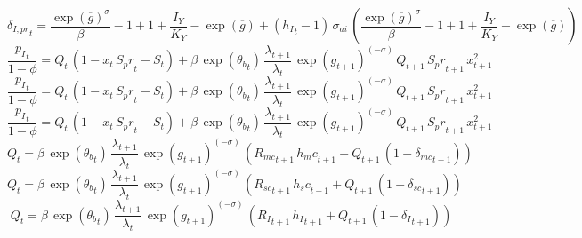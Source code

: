 \begin{dmath}
{{\delta_{I,pr}}}_{t}=\frac{\exp\left({{\overline{g}}}\right)^{{{\sigma}}}}{{{\beta}}}-1+1+\frac{{{I_Y}}}{{{K_Y}}}-\exp\left({{\overline{g}}}\right)+\left({{h_I}}_{t}-1\right)\, {{\sigma_{ai}}}\, \left(\frac{\exp\left({{\overline{g}}}\right)^{{{\sigma}}}}{{{\beta}}}-1+1+\frac{{{I_Y}}}{{{K_Y}}}-\exp\left({{\overline{g}}}\right)\right)
\end{dmath}
\begin{dmath}
\frac{{{p_I}}_{t}}{1-{{\phi}}}={{Q}}_{t}\, \left(1-{{x}}_{t}\, {S_pr}_{t}-{S}_{t}\right)+{{\beta}}\, \exp\left({{\theta_b}}_{t}\right)\, \frac{{{\lambda}}_{t+1}}{{{\lambda}}_{t}}\, \exp\left({{g}}_{t+1}\right)^{\left(-{{\sigma}}\right)}\, {{Q}}_{t+1}\, {S_pr}_{t+1}\, {{x}}_{t+1}^{2}
\end{dmath}
\begin{dmath}
\frac{{{p_I}}_{t}}{1-{{\phi}}}={{Q}}_{t}\, \left(1-{{x}}_{t}\, {S_pr}_{t}-{S}_{t}\right)+{{\beta}}\, \exp\left({{\theta_b}}_{t}\right)\, \frac{{{\lambda}}_{t+1}}{{{\lambda}}_{t}}\, \exp\left({{g}}_{t+1}\right)^{\left(-{{\sigma}}\right)}\, {{Q}}_{t+1}\, {S_pr}_{t+1}\, {{x}}_{t+1}^{2}
\end{dmath}
\begin{dmath}
\frac{{{p_I}}_{t}}{1-{{\phi}}}={{Q}}_{t}\, \left(1-{{x}}_{t}\, {S_pr}_{t}-{S}_{t}\right)+{{\beta}}\, \exp\left({{\theta_b}}_{t}\right)\, \frac{{{\lambda}}_{t+1}}{{{\lambda}}_{t}}\, \exp\left({{g}}_{t+1}\right)^{\left(-{{\sigma}}\right)}\, {{Q}}_{t+1}\, {S_pr}_{t+1}\, {{x}}_{t+1}^{2}
\end{dmath}
\begin{dmath}
{{Q}}_{t}={{\beta}}\, \exp\left({{\theta_b}}_{t}\right)\, \frac{{{\lambda}}_{t+1}}{{{\lambda}}_{t}}\, \exp\left({{g}}_{t+1}\right)^{\left(-{{\sigma}}\right)}\, \left({{R_{mc}}}_{t+1}\, {{h_mc}}_{t+1}+{{Q}}_{t+1}\, \left(1-{{\delta_{mc}}}_{t+1}\right)\right)
\end{dmath}
\begin{dmath}
{{Q}}_{t}={{\beta}}\, \exp\left({{\theta_b}}_{t}\right)\, \frac{{{\lambda}}_{t+1}}{{{\lambda}}_{t}}\, \exp\left({{g}}_{t+1}\right)^{\left(-{{\sigma}}\right)}\, \left({{R_{sc}}}_{t+1}\, {{h_sc}}_{t+1}+{{Q}}_{t+1}\, \left(1-{{\delta_{sc}}}_{t+1}\right)\right)
\end{dmath}
\begin{dmath}
{{Q}}_{t}={{\beta}}\, \exp\left({{\theta_b}}_{t}\right)\, \frac{{{\lambda}}_{t+1}}{{{\lambda}}_{t}}\, \exp\left({{g}}_{t+1}\right)^{\left(-{{\sigma}}\right)}\, \left({{R_I}}_{t+1}\, {{h_I}}_{t+1}+{{Q}}_{t+1}\, \left(1-{{\delta_I}}_{t+1}\right)\right)
\end{dmath}
